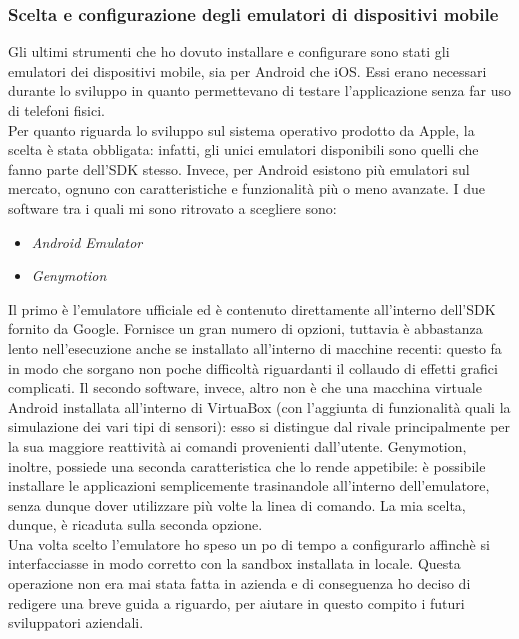 			\subsubsection{Scelta e configurazione degli emulatori di dispositivi mobile}
				Gli ultimi strumenti che ho dovuto installare e configurare sono stati gli emulatori dei dispositivi mobile, sia per
				Android che iOS. Essi erano necessari durante lo sviluppo in quanto permettevano di testare l'applicazione senza far
				uso di telefoni fisici.\\
				Per quanto riguarda lo sviluppo sul sistema operativo prodotto da Apple, la scelta è stata obbligata: infatti, gli
				unici emulatori disponibili sono quelli che fanno parte dell'SDK stesso. Invece, per Android esistono più
				emulatori sul mercato, ognuno con caratteristiche e funzionalità più o meno avanzate. I due software tra i quali mi
				sono ritrovato a scegliere sono:
				\begin{itemize}
					\item \emph{Android Emulator}
					\item \emph{Genymotion}
				\end{itemize}
				Il primo è l'emulatore ufficiale ed è contenuto direttamente all'interno dell'SDK fornito da Google. Fornisce un
				gran numero di opzioni, tuttavia è abbastanza lento nell'esecuzione anche se installato all'interno di macchine
				recenti: questo fa in modo che sorgano non poche difficoltà riguardanti il collaudo di effetti grafici complicati. Il
				secondo software, invece, altro non è che una macchina virtuale Android installata all'interno di VirtuaBox (con
				l'aggiunta di funzionalità quali la simulazione dei vari tipi di sensori): esso si distingue dal rivale
				principalmente per la sua maggiore reattività ai comandi provenienti dall'utente. Genymotion, inoltre, possiede una
				seconda caratteristica che lo rende appetibile: è possibile installare le applicazioni semplicemente trasinandole
				all'interno dell'emulatore, senza dunque dover utilizzare più volte la linea di comando. La mia scelta, dunque, è
				ricaduta sulla seconda opzione.\\
				Una volta scelto l'emulatore ho speso un po di tempo a configurarlo affinchè si interfacciasse in modo corretto con
				la sandbox installata in locale. Questa operazione non era mai stata fatta in azienda e di conseguenza ho deciso di
				redigere una breve guida a riguardo, per aiutare in questo compito i futuri sviluppatori aziendali.
